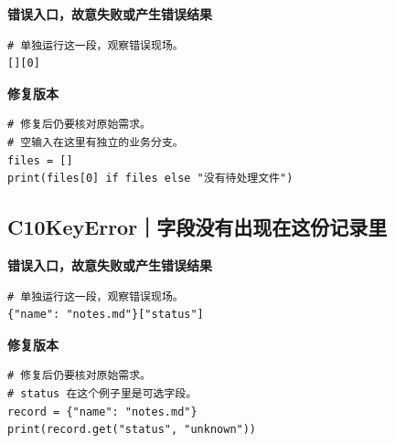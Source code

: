 



\textbf{错误入口，故意失败或产生错误结果}

\begin{lstlisting}[style=errorcode,title={错误复现（故意失败或错误结果）：\code{case_09_bad.py.txt}}]
# 单独运行这一段，观察错误现场。
[][0]
\end{lstlisting}

\textbf{修复版本}

\begin{lstlisting}[title={\code{case_09.py}}]
# 修复后仍要核对原始需求。
# 空输入在这里有独立的业务分支。
files = []
print(files[0] if files else "没有待处理文件")
\end{lstlisting}


\subsection*{C10\enspace KeyError｜字段没有出现在这份记录里}





\textbf{错误入口，故意失败或产生错误结果}

\begin{lstlisting}[style=errorcode,title={错误复现（故意失败或错误结果）：\code{case_10_bad.py.txt}}]
# 单独运行这一段，观察错误现场。
{"name": "notes.md"}["status"]
\end{lstlisting}

\textbf{修复版本}

\begin{lstlisting}[title={\code{case_10.py}}]
# 修复后仍要核对原始需求。
# status 在这个例子里是可选字段。
record = {"name": "notes.md"}
print(record.get("status", "unknown"))
\end{lstlisting}

